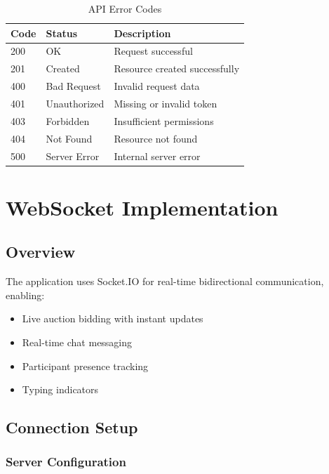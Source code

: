 \documentclass[12pt,a4paper]{report}
\begin{document}
\begin{table}[H]
\centering
\begin{tabularx}{\textwidth}{|l|l|X|}
\hline
\textbf{Code} & \textbf{Status} & \textbf{Description} \\
\hline
200 & OK & Request successful \\
\hline
201 & Created & Resource created successfully \\
\hline
400 & Bad Request & Invalid request data \\
\hline
401 & Unauthorized & Missing or invalid token \\
\hline
403 & Forbidden & Insufficient permissions \\
\hline
404 & Not Found & Resource not found \\
\hline
500 & Server Error & Internal server error \\
\hline
\end{tabularx}
\caption{API Error Codes}
\end{table}

\chapter{WebSocket Implementation}

\section{Overview}

The application uses Socket.IO for real-time bidirectional communication, enabling:
\begin{itemize}
    \item Live auction bidding with instant updates
    \item Real-time chat messaging
    \item Participant presence tracking
    \item Typing indicators
\end{itemize}

\section{Connection Setup}

\subsection{Server Configuration}
\end{document}
